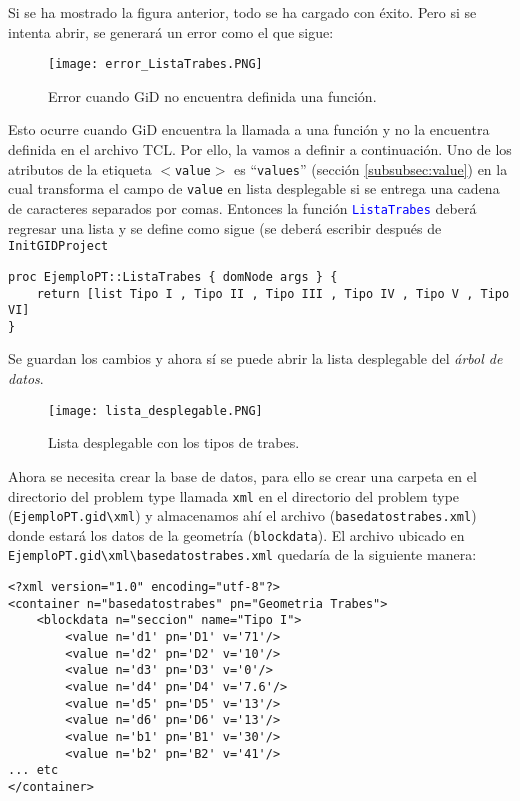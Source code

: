 \documentclass[10pt, a4paper, twocolumn]{article} %
\begin{document}
Si se ha mostrado la figura anterior, todo se ha cargado con éxito. Pero si se intenta abrir, se generará un error como el que sigue:

\begin{figure}[hbt!]\centering
	\texttt{[image: error\_ListaTrabes.PNG]}
	\label{fig:error_ListaTrabes}
	\caption{Error cuando GiD no encuentra definida una función.}
\end{figure}

Esto ocurre cuando GiD encuentra la llamada a una función y no la encuentra definida en el archivo TCL. Por ello, la vamos a definir a continuación. Uno de los atributos de la etiqueta \texttt{$<$value$>$} es ``\texttt{values}'' (sección \ref{subsubsec:value}) en la cual transforma el campo de \texttt{value} en lista desplegable si se entrega una cadena de caracteres separados por comas. Entonces la función \textcolor{blue}{\texttt{ListaTrabes}} deberá regresar una lista y se define como sigue (se deberá escribir después de \texttt{InitGIDProject}

\lstset{language=tcl} 
\begin{lstlisting}
proc EjemploPT::ListaTrabes { domNode args } {
	return [list Tipo I , Tipo II , Tipo III , Tipo IV , Tipo V , Tipo VI]
}
\end{lstlisting}

Se guardan los cambios y ahora sí se puede abrir la lista desplegable del \textit{árbol de datos}.

\begin{figure}[hbt!]\centering
	\texttt{[image: lista\_desplegable.PNG]}
	\label{fig:lista_desplegable}
	\caption{Lista desplegable con los tipos de trabes.}
\end{figure}

Ahora se necesita crear la base de datos, para ello se crear una carpeta en el directorio del problem type llamada \texttt{xml} en el directorio del problem type (\texttt{EjemploPT.gid\textbackslash xml}) y almacenamos ahí el archivo (\texttt{basedatostrabes.xml}) donde estará los datos de la geometría (\texttt{blockdata}). El archivo ubicado en \texttt{EjemploPT.gid\textbackslash xml\textbackslash basedatostrabes.xml} quedaría de la siguiente manera:


\lstset{language=XML} 
\begin{lstlisting}[caption={Extracto de la base de datos de la geometría.}]
<?xml version="1.0" encoding="utf-8"?>
<container n="basedatostrabes" pn="Geometria Trabes">
	<blockdata n="seccion" name="Tipo I">
		<value n='d1' pn='D1' v='71'/>
		<value n='d2' pn='D2' v='10'/>
		<value n='d3' pn='D3' v='0'/>
		<value n='d4' pn='D4' v='7.6'/>
		<value n='d5' pn='D5' v='13'/>
		<value n='d6' pn='D6' v='13'/>
		<value n='b1' pn='B1' v='30'/>
		<value n='b2' pn='B2' v='41'/>
... etc
</container>
\end{lstlisting}
\end{document}
